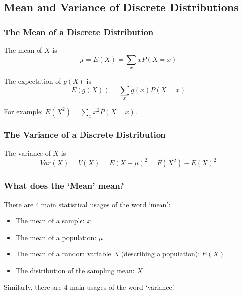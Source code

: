 \documentclass[t,xcolor=pdftex,dvipsnames,table]{beamer}\usepackage[]{graphicx}\usepackage[]{color}
\begin{document}
\subsection{Mean and Variance of Discrete Distributions}
\begin{frame}\frametitle{The Mean of a Discrete Distribution}

\begin{definition}
The mean of $X$ is 
\[ \mu = E(X) = \sum_{x} x P(X=x)  \]

\end{definition}

\begin{definition}

The expectation of $g(X)$ is 
\[ E(g(X)) = \sum_{x} g(x) P(X=x)  \]

For example: $E(X^2) = \sum_{x} x^2 P(X=x) $.

\end{definition}

\end{frame}

\begin{frame}\frametitle{The Variance of a Discrete Distribution}
\begin{definition}[Variance]

The variance of $X$ is 
\[ Var(X) = V(X) =  E(X - \mu)^2 = E(X^2) - E(X)^2  \]
\end{definition}

\end{frame}


\begin{frame}\frametitle{What does the `Mean' mean?}

There are 4 main statistical usages of the word `mean':
\begin{itemize}
\item 
The mean of a sample: $\bar{x}$
\item
The mean of a population: $\mu$
\item
The mean of a random variable $X$ (describing a population): $E(X)$
\item
The distribution of the sampling mean: $\bar{X}$
\end{itemize}

\vspace{.5cm}
Similarly, there are 4 main usages of the word `variance'.

\end{frame}
\end{document}

